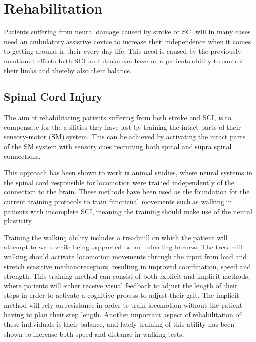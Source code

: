\section{Rehabilitation}

Patients suffering from neural damage caused by stroke or SCI will in many cases need an ambulatory assistive device to increase their independence when it comes to getting around in their every day life. \cite{Sandrini2018,Michael2005} This need is caused by the previously mentioned effects both SCI and stroke can have on a patients ability to control their limbs and thereby also their balance. 

\subsection{Spinal Cord Injury}

The aim of rehabilitating patients suffering from both stroke and SCI, is to compensate for the abilities they have lost by training the intact parts of their sensory-motor (SM) system. This can be achieved by activating the intact parts of the SM system with sensory cues recruiting both spinal and supra spinal connections. \cite{Sandrini2018}

This approach has been shown to work in animal studies, where neural systems in the spinal cord responsible for locomotion were trained independently of the connection to the brain. These methods have been used as the foundation for the current training protocols to train functional movements such as walking in patients with incomplete SCI, meaning the training should make use of the neural plasticity. \cite{Sandrini2018}

Training the walking ability includes a treadmill on which the patient will attempt to walk while being supported by an unloading harness. The treadmill walking should activate locomotion movements through the input from load and stretch sensitive mechanoreceptors, resulting in improved coordination, speed and strength. This training method can consist of both explicit and implicit methods, where patients will either receive visual feedback to adjust the length of their steps in order to activate a cognitive process to adjust their gait. The implicit method will rely on resistance in order to train locomotion without the patient having to plan their step length. Another important aspect of rehabilitation of these individuals is their balance, and lately training of this ability has been shown to increase both speed and distance in walking tests. \cite{Sandrini2018}

